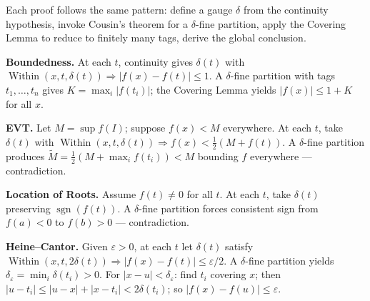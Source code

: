 \begin{remark*}
Each proof follows the same pattern: define a gauge $\delta$ from
the continuity hypothesis, invoke Cousin's theorem for a $\delta$-fine
partition, apply the Covering Lemma to reduce to finitely many tags,
derive the global conclusion.

\medskip
\textbf{Boundedness.} At each $t$, continuity gives $\delta(t)$ with
$\operatorname{Within}(x,t,\delta(t))\Rightarrow|f(x)-f(t)|\leq 1$.
A $\delta$-fine partition with tags $t_1,\ldots,t_n$ gives
$K=\max_i|f(t_i)|$; the Covering Lemma yields $|f(x)|\leq 1+K$ for
all $x$.

\medskip
\textbf{EVT.} Let $M=\sup f(I)$; suppose $f(x)<M$ everywhere. At
each $t$, take $\delta(t)$ with
$\operatorname{Within}(x,t,\delta(t))\Rightarrow f(x)<\tfrac{1}{2}(M+f(t))$.
A $\delta$-fine partition produces $\widetilde{M}=\tfrac{1}{2}(M+\max_if(t_i))<M$
bounding $f$ everywhere --- contradiction.

\medskip
\textbf{Location of Roots.} Assume $f(t)\neq 0$ for all $t$. At
each $t$, take $\delta(t)$ preserving $\operatorname{sgn}(f(t))$. A
$\delta$-fine partition forces consistent sign from $f(a)<0$ to
$f(b)>0$ --- contradiction.

\medskip
\textbf{Heine--Cantor.} Given $\varepsilon>0$, at each $t$ let
$\delta(t)$ satisfy $\operatorname{Within}(x,t,2\delta(t))
\Rightarrow|f(x)-f(t)|\leq\varepsilon/2$. A $\delta$-fine partition
yields $\delta_\varepsilon=\min_i\delta(t_i)>0$. For $|x-u|<\delta_\varepsilon$:
find $t_i$ covering $x$; then $|u-t_i|\leq|u-x|+|x-t_i|<2\delta(t_i)$;
so $|f(x)-f(u)|\leq\varepsilon$.
\end{remark*}
